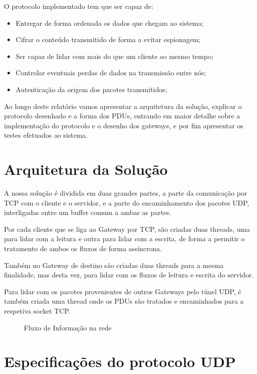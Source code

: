 \documentclass[a4paper]{report}
\begin{document}
O protocolo implementado tem que ser capaz de: 

\begin{itemize}
        \item Entregar de forma ordenada os dados que chegam ao sistema;
        \item Cifrar o conteúdo transmitido de forma a evitar espionagem;
        \item Ser capaz de lidar com mais do que um cliente ao mesmo tempo;
        \item Controlar eventuais perdas de dados na transmissão entre nós;
        \item Autenticação da origem dos pacotes transmitidos;
\end{itemize}

Ao longo deste relatório vamos apresentar a arquitetura da solução, explicar
o protocolo desenhado e a forma dos PDUs, entrando em maior detalhe sobre a
implementação do protocolo e o desenho dos gateways, e por fim apresentar os
testes efetuados ao sistema.

\chapter{Arquitetura da Solução}

A nossa solução é dividida em duas grandes partes, a parte da comunicação
por TCP com o cliente e o servidor, e a parte do encaminhamento dos pacotes
UDP, interligadas entre um buffer comum a ambas as partes.

Por cada cliente que se liga ao Gateway por TCP, são criadas duas threads, 
uma para lidar com a leitura e outra para lidar com a escrita, de forma
a permitir o tratamento de ambos os fluxos de forma assíncrona.

Também no Gateway de destino são criadas duas threads para a mesma finalidade,
mas desta vez, para lidar com os fluxos de leitura e escrita do servidor.

Para lidar com os pacotes provenientes de outros Gateways pelo túnel UDP,
é também criada uma thread onde os PDUs são tratados e encaminhados para a
respetiva socket TCP.

\begin{figure}[H]
    \hspace*{-2cm}
    
    \caption{Fluxo de Informação na rede}\label{fig:structure}
\end{figure}

\chapter{Especificações do protocolo UDP}
\end{document}

